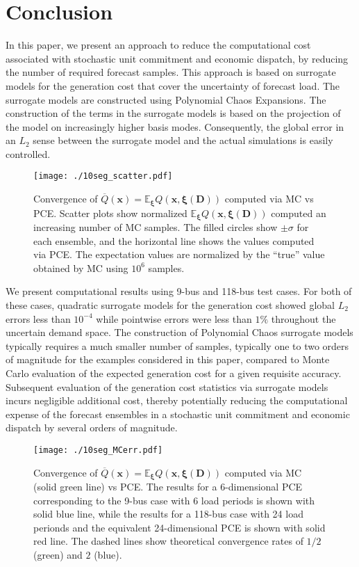 \documentclass[conference]{IEEEtran}
\begin{document}
\section{Conclusion}
\label{sec:conclusion}

In this paper, we present an approach to reduce the computational cost
associated with stochastic unit commitment and economic dispatch, by
reducing the number of required forecast samples.
This approach is based on surrogate
models for the generation cost that cover the uncertainty of forecast
load. The surrogate models are constructed using Polynomial Chaos
Expansions. The construction of the terms in the surrogate models is
based on the projection of the model on increasingly higher basis
modes. Consequently, the global error in an $L_2$ sense between the surrogate
model and the actual simulations is easily controlled.

\begin{figure}[t]
\centering
\texttt{[image: ./10seg\_scatter.pdf]}
\caption{\label{fig:pcst} Convergence of $\overline Q(\bm{x})=\mathbb E_{\bm{\xi}}
  Q(\bm{x}, \bm{\xi}(\bm{D}))$ computed via MC vs PCE.
  Scatter plots show normalized $\mathbb E_{\bm{\xi}}
  Q(\bm{x}, \bm{\xi}(\bm{D}))$ computed an increasing number of MC
  samples. The filled circles show $\pm\sigma$ for each ensemble, and
  the horizontal line shows the values computed via PCE. The
  expectation values are normalized by the ``true'' value obtained by
  MC using $10^6$ samples.} 
\end{figure}

We present computational results using 9-bus and 118-bus test cases. For
both of these cases, quadratic surrogate models for the generation cost
showed global $L_2$ errors less than $10^{-4}$ while pointwise errors
were less than $1\%$ throughout the uncertain demand space. The
construction of Polynomial Chaos surrogate models typically requires
a much smaller number of samples, typically one to two orders of
magnitude for the examples considered in this paper,
compared to Monte Carlo evaluation of the expected generation cost for
a given requisite accuracy.
Subsequent evaluation of the
generation cost statistics via surrogate models incurs negligible
additional cost, thereby potentially reducing the computational
expense of the forecast ensembles in a stochastic unit commitment and
economic dispatch by several orders of magnitude.

\begin{figure}[t]
\centering
\texttt{[image: ./10seg\_MCerr.pdf]}
\caption{\label{fig:conv} Convergence of $\overline Q(\bm{x})=\mathbb E_{\bm{\xi}}
  Q(\bm{x}, \bm{\xi}(\bm{D}))$ computed via MC (solid green line)
  vs PCE. The results for a 6-dimensional PCE corresponding to
  the 9-bus case with 6 load periods is shown with solid blue line, while the results for
  a 118-bus case with 24 load perionds and the equivalent 24-dimensional PCE is
  shown with solid red line. The dashed lines show theoretical
  convergence rates of $1/2$ (green) and $2$ (blue).}
\end{figure}
\end{document}
